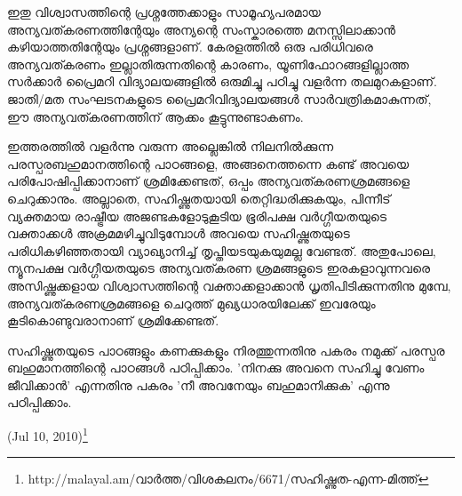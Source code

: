 ഇതു വിശ്വാസത്തിന്റെ പ്രശ്നത്തേക്കാളും സാമൂഹ്യപരമായ അന്യവത്കരണത്തിന്റേയും അന്യന്റെ സംസ്കാരത്തെ മനസ്സിലാക്കാന്‍ 
കഴിയാത്തതിന്റേയും പ്രശ്നങ്ങളാണ്. കേരളത്തില്‍ ഒരു പരിധിവരെ അന്യവത്കരണം ഇല്ലാതിരുന്നതിന്റെ കാരണം, 
യൂണിഫോറങ്ങളില്ലാത്ത സര്‍ക്കാര്‍ പ്രൈമറി വിദ്യാലയങ്ങളില്‍ ഒരുമിച്ചു പഠിച്ചു വളര്‍ന്ന തലമുറകളാണ്. ജാതി/മത സംഘടനകളുടെ 
പ്രൈമറിവിദ്യാലയങ്ങള്‍ സാര്‍വത്രികമാകുന്നത്, ഈ അന്യവത്കരണത്തിന് ആക്കം കൂട്ടുന്നുണ്ടാകണം.

ഇത്തരത്തില്‍ വളര്‍ന്നു വരുന്ന അല്ലെങ്കില്‍ നിലനില്‍ക്കുന്ന പരസ്പരബഹുമാനത്തിന്റെ പാഠങ്ങളെ, അങ്ങനെത്തന്നെ കണ്ട് അവയെ
 പരിപോഷിപ്പിക്കാനാണ് ശ്രമിക്കേണ്ടത്, ഒപ്പം അന്യവത്കരണശ്രമങ്ങളെ ചെറുക്കാനും. അല്ലാതെ, സഹിഷ്ണുതയായി തെറ്റിദ്ധരിക്കുകയും, 
 പിന്നീട് വ്യക്തമായ രാഷ്ട്രീയ അജണ്ടകളോടുകൂടിയ ഭൂരിപക്ഷ വര്‍ഗ്ഗീയതയുടെ വക്താക്കള്‍ അക്രമമഴിച്ചുവിടുമ്പോള്‍ അവയെ സഹിഷ്ണുതയുടെ 
 പരിധികഴിഞ്ഞതായി വ്യാഖ്യാനിച്ച് തൃപ്തിയടയുകയുമല്ല വേണ്ടത്. അതുപോലെ, ന്യൂനപക്ഷ വര്‍ഗ്ഗീയതയുടെ അന്യവത്കരണ ശ്രമങ്ങളുടെ 
 ഇരകളാവുന്നവരെ അസിഷ്ണുക്കളായ വിശ്വാസത്തിന്റെ വക്താക്കളാക്കാന്‍ ധൃതിപിടിക്കുന്നതിനു മുമ്പേ, അന്യവത്കരണശ്രമങ്ങളെ 
 ചെറുത്ത് മുഖ്യധാരയിലേക്ക് ഇവരേയും കൂടികൊണ്ടുവരാനാണ് ശ്രമിക്കേണ്ടത്.

സഹിഷ്ണുതയുടെ പാഠങ്ങളും കണക്കുകളും നിരത്തുന്നതിനു പകരം നമുക്ക് പരസ്പര ബഹുമാനത്തിന്റെ പാഠങ്ങള്‍ പഠിപ്പിക്കാം. 
'നിനക്കു അവനെ സഹിച്ചു വേണം ജീവിക്കാന്‍' എന്നതിനു പകരം 'നീ അവനേയും ബഹുമാനിക്കുക' എന്നു പഠിപ്പിക്കാം.

(Jul 10, 2010)\footnote{http://malayal.am/വാര്‍ത്ത/വിശകലനം/6671/സഹിഷ്ണുത-എന്ന-മിത്ത്}
\newpage
